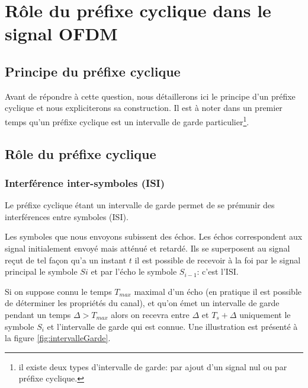 \chapter{Rôle du préfixe cyclique dans le signal OFDM}

\section{Principe du préfixe cyclique}

Avant de répondre à cette question, nous détaillerons ici le principe d'un
préfixe cyclique et nous expliciterons sa construction. Il est à noter dans un
premier temps qu'un préfixe cyclique est un intervalle de garde
particulier\footnote{il existe deux types d'intervalle de garde: par ajout d'un
  signal nul ou par préfixe cyclique.}.


\section{Rôle du préfixe cyclique}

\subsection{Interférence inter-symboles (ISI)}




Le préfixe cyclique étant un intervalle de garde permet de se prémunir des
interférences entre symboles (ISI).

Les symboles que nous envoyons subissent des échos. Les échos correspondent aux
signal initialement envoyé mais atténué et retardé. Ils se superposent au signal
reçut de tel façon qu'a un instant $t$ il est possible de recevoir à la foi par le
signal principal le symbole $Si$ et par l'écho le symbole $S_{i-1}$: c'est l'ISI.

Si on suppose connu le temps $T_{max}$ maximal d'un écho (en pratique il est possible de
déterminer les propriétés du canal), et qu'on émet un intervalle de garde
pendant un temps $\Delta > T_{max}$ alors on recevra entre $\Delta$ et
$T_s+\Delta$ uniquement le symbole $S_i$ et l'intervalle de garde qui est
connue. Une illustration est présenté à la figure \ref{fig:intervalleGarde}.
~\\

